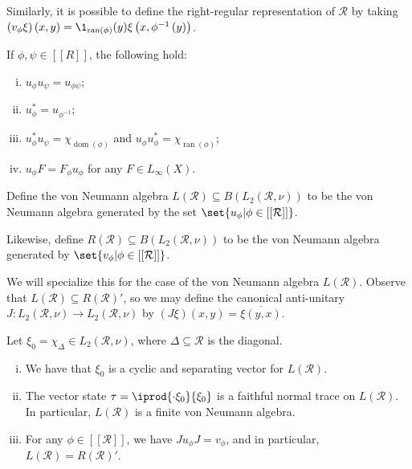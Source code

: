 \documentclass[10pt]{mypackage}
\begin{document}
Similarly, it is possible to define the right-regular representation of $\mathcal{R}$ by taking $\left( v_{\phi}\xi \right)\left( x,y \right) = \1_{\operatorname{ran}\left( \phi \right)}(y)\xi\left( x,\phi^{-1}\left( y \right) \right)$.
\begin{proposition}
  If $\phi,\psi\in \left[ \left[ R \right] \right]$, the following hold:
  \begin{enumerate}[(i)]
    \item $u_{\phi}u_{\psi} = u_{\phi\psi}$;
    \item $u_{\phi}^{\ast} = u_{\phi^{-1}}$;
    \item $u_{\phi}^{\ast}u_{\psi} = \chi_{\operatorname{dom}\left( \phi \right)}$ and $u_{\phi}u_{\phi}^{\ast} = \chi_{\operatorname{ran}\left( \phi \right)}$;
    \item $u_{\phi}F = F_{\phi}u_{\phi}$ for any $F\in L_{\infty}\left( X \right)$.
  \end{enumerate}
\end{proposition}
\begin{definition}
  Define the von Neumann algebra $L\left( \mathcal{R} \right)\subseteq B\left( L_2\left( \mathcal{R},\nu \right) \right)$ to be the von Neumann algebra generated by the set $\set{u_{\phi} | \phi\in \left[ \left[ \mathcal{R} \right] \right]}$.

  Likewise, define $R\left( \mathcal{R} \right)\subseteq B\left( L_2\left( \mathcal{R},\nu \right) \right)$ to be the von Neumann algebra generated by $\set{v_{\phi} | \phi\in \left[ \left[ \mathcal{R} \right] \right]}$.
\end{definition}
We will specialize this for the case of the von Neumann algebra $L\left( \mathcal{R} \right)$. Observe that $L\left( \mathcal{R} \right)\subseteq R\left( \mathcal{R} \right)'$, so we may define the canonical anti-unitary $J\colon L_2\left( \mathcal{R},\nu \right)\rightarrow L_2\left( \mathcal{R},\nu \right)$ by $\left( J\xi \right)\left( x,y \right) = \overline{\xi\left( y,x \right)}$.
\begin{proposition}
  Let $\xi_0 = \chi_{\Delta}\in L_2\left( \mathcal{R},\nu \right)$, where $\Delta\subseteq \mathcal{R}$ is the diagonal.
  \begin{enumerate}[(i)]
    \item We have that $\xi_0$ is a cyclic and separating vector for $L\left( \mathcal{R} \right)$.
    \item The vector state $ \tau = \iprod{\cdot \xi_0}{\xi_0} $ is a faithful normal trace on $L\left( \mathcal{R} \right)$. In particular, $L\left( \mathcal{R} \right)$ is a finite von Neumann algebra.
    \item For any $\phi\in \left[ \left[ \mathcal{R} \right] \right]$, we have $Ju_{\phi}J = v_{\phi}$, and in particular, $L\left( \mathcal{R} \right) = R\left( \mathcal{R} \right)'$.
  \end{enumerate}
\end{proposition}
\end{document}
